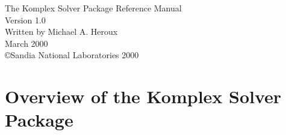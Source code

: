 \documentclass[letterpaper]{book}
\begin{document}
\begin{titlepage}
\setlength{\epsfxsize}{\textwidth}
\begin{center}
{\Huge The Komplex Solver Package Reference Manual\\[1ex]\large Version 1.0}\\
\vspace*{1cm}
{\large Written by Michael A. Heroux}\\
\vspace*{0.5cm}
{\small March 2000}\\
\copyright Sandia National Laboratories 2000
\end{center}
\end{titlepage}
\clearemptydoublepage
{}
\tableofcontents
\clearemptydoublepage
{}
\chapter{Overview of the Komplex Solver Package}

\end{document}
